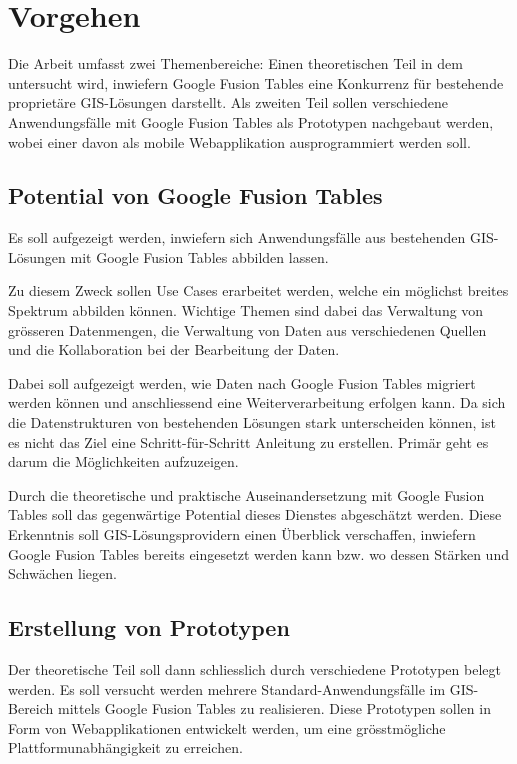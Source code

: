 \section{Vorgehen}
Die Arbeit umfasst zwei Themenbereiche: Einen theoretischen Teil in dem untersucht wird, inwiefern Google Fusion Tables eine Konkurrenz für bestehende proprietäre \gls{GIS}-Lösungen darstellt. Als zweiten Teil sollen verschiedene Anwendungsfälle mit Google Fusion Tables als Prototypen nachgebaut werden, wobei einer davon als mobile Webapplikation ausprogrammiert werden soll.

\subsection{Potential von Google Fusion Tables}
Es soll aufgezeigt werden, inwiefern sich Anwendungsfälle aus bestehenden \gls{GIS}-Lösungen mit Google Fusion Tables abbilden lassen.

Zu diesem Zweck sollen Use Cases erarbeitet werden, welche ein möglichst breites Spektrum abbilden können. Wichtige Themen sind dabei das Verwaltung von grösseren Datenmengen, die Verwaltung von Daten aus verschiedenen Quellen und die Kollaboration bei der Bearbeitung der Daten.

Dabei soll aufgezeigt werden, wie Daten nach Google Fusion Tables migriert werden können und anschliessend eine Weiterverarbeitung erfolgen kann. Da sich die Datenstrukturen von bestehenden Lösungen stark unterscheiden können, ist es nicht das Ziel eine Schritt-für-Schritt Anleitung zu erstellen. Primär geht es darum die Möglichkeiten aufzuzeigen.

Durch die theoretische und praktische Auseinandersetzung mit Google Fusion Tables soll das gegenwärtige Potential dieses Dienstes abgeschätzt werden. Diese Erkenntnis soll \gls{GIS}-Lösungsprovidern einen Überblick verschaffen, inwiefern Google Fusion Tables bereits eingesetzt werden kann bzw. wo dessen Stärken und Schwächen liegen.

\subsection{Erstellung von Prototypen}
Der theoretische Teil soll dann schliesslich durch verschiedene Prototypen belegt werden. Es soll versucht werden mehrere Standard-Anwendungsfälle im GIS-Bereich mittels Google Fusion Tables zu realisieren. Diese Prototypen sollen in Form von Webapplikationen entwickelt werden, um eine grösstmögliche Plattformunabhängigkeit zu erreichen.

